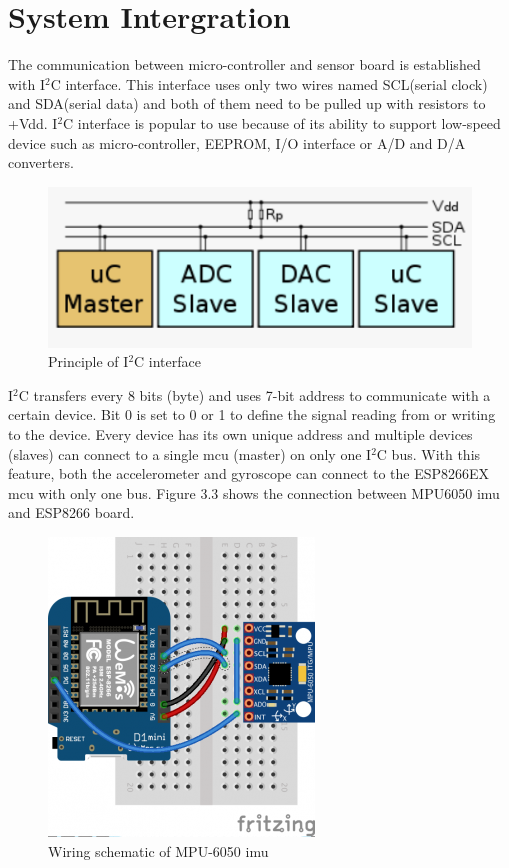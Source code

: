\documentclass[letterpaper,12pt,titlepage,oneside,final]{book}
\let\origdoublepage\cleardoublepage
\newcommand{\clearemptydoublepage}{%
	\clearpage{\pagestyle{empty}\origdoublepage}}
\let\cleardoublepage\clearemptydoublepage
\begin{document}
\section{System Intergration}
The communication between micro-controller and sensor board is established with I$^{2}$C interface. 	This interface uses only two wires named SCL(serial clock) and SDA(serial data) and both of them need to be pulled up with resistors to +Vdd. I$^{2}$C interface is popular to use because of its ability to support low-speed device such as micro-controller, EEPROM, I/O interface or A/D and D/A converters.  
\cleardoublepage
\begin{figure}[h]
	\centering
	\includegraphics{I2C}
	\caption{Principle of I$^{2}$C interface \cite{i2c}}
\end{figure}\par
I$^{2}$C transfers every 8 bits (byte) and uses 7-bit address to communicate with a certain device. Bit 0 is set to 0 or 1 to define the signal reading from or writing to the device. Every device has its own unique address and multiple devices (slaves) can connect to a single \gls{mcu} (master) on only one I$^{2}$C bus. With this feature, both the accelerometer and gyroscope can connect to the ESP8266EX \gls{mcu} with only one bus. Figure 3.3 shows the connection between MPU6050 \gls{imu} and ESP8266 board.
\begin{figure}[h!]
	\centering
	\includegraphics[scale=0.6]{mpu6050-esp8266}
	\caption{Wiring schematic of MPU-6050 \gls{imu} \cite{d1sche}}
\end{figure} \par
\end{document}
